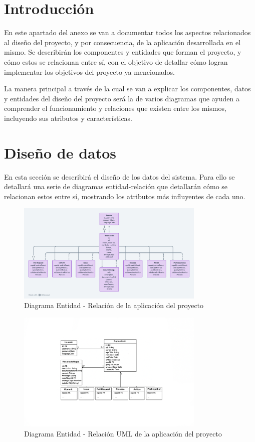 
\section{Introducción}
En este apartado del anexo se van a documentar todos los aspectos relacionados al diseño del proyecto, y por consecuencia, de la aplicación desarrollada en el mismo. Se describirán los componentes y entidades que forman el proyecto, y cómo estos se relacionan entre sí, con el objetivo de detallar cómo logran implementar los objetivos del proyecto ya mencionados.

La manera principal a través de la cual se van a explicar los componentes, datos y entidades del diseño del proyecto será la de varios diagramas que ayuden a comprender el funcionamiento y relaciones que existen entre los mismos, incluyendo sus atributos y características.

\section{Diseño de datos}

En esta sección se describirá el diseño de los datos del sistema. Para ello se detallará una serie de diagramas entidad-relación que detallarán cómo se relacionan estos entre sí, mostrando los atributos más influyentes de cada uno. 

\begin{figure}[H]
\centering
\includegraphics[width=0.8\textwidth]{img/Diagrama-entidad-relacion.png}
\caption{Diagrama Entidad - Relación de la aplicación del proyecto}
\label{fig:DiagramaER}
\end{figure}

\begin{figure}[H]
\centering
\includegraphics[width=0.8\textwidth]{img/Diagrama-entidad-relacionUML.png}
\caption{Diagrama Entidad - Relación UML de la aplicación del proyecto}
\label{fig:DiagramaER_UML}
\end{figure}

